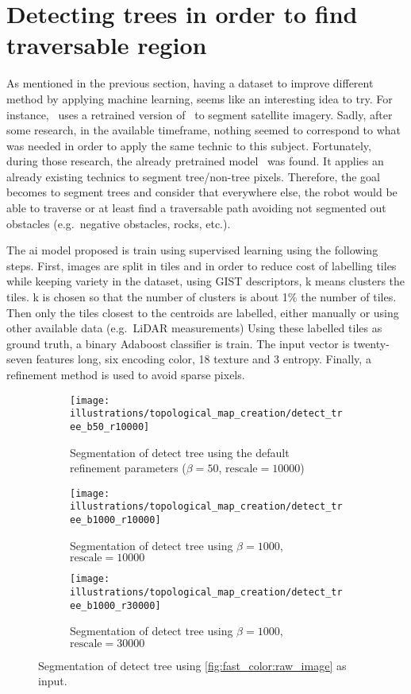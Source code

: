 \section{Detecting trees in order to find traversable region}

As mentioned in the previous section, having a dataset to improve different method by applying machine learning, seems
like an interesting idea to try.
For instance,~\cite{zhang_dual-bev_2025} uses a retrained version of~\cite{ronneberger_u-net_2015} to segment satellite imagery.
Sadly, after some research, in the available timeframe, nothing seemed to correspond to what was needed in order to
apply the same technic to this subject.
Fortunately, during those research, the already pretrained model~\cite{bosch_journal_2020} was found.
It applies an already existing technics to segment tree/non-tree pixels.
Therefore, the goal becomes to segment trees and consider that everywhere else, the robot would be able to traverse
or at least find a traversable path avoiding not segmented out obstacles (e.g.\ negative obstacles, rocks, etc.).

The \gls{ai} model proposed is train using supervised learning using the following steps.
First, images are split in tiles and in order to reduce cost of labelling tiles while keeping variety in the dataset,
using GIST descriptors, k means clusters the tiles.
k is chosen so that the number of clusters is about 1\% the number of tiles.
Then only the tiles closest to the centroids are labelled, either manually or using other available data (e.g.\ LiDAR measurements)
Using these labelled tiles as ground truth, a binary Adaboost classifier is train.
The input vector is twenty-seven features long, six encoding color, 18 texture and 3 entropy.
Finally, a refinement method is used to avoid sparse pixels.

\begin{figure}
    \begin{subfigure}[t]{.32\textwidth}
        \texttt{[image: illustrations/topological\_map\_creation/detect\_tree\_b50\_r10000]}
        \caption{Segmentation of detect tree using the default refinement parameters ($\beta = 50$, $\text{rescale} = 10000$)}
    \end{subfigure}
    \hfill
    \begin{subfigure}[t]{.32\textwidth}
        \texttt{[image: illustrations/topological\_map\_creation/detect\_tree\_b1000\_r10000]}
        \caption{Segmentation of detect tree using $\beta = 1000$, $\text{rescale} = 10000$}
    \end{subfigure}
    \hfill
    \begin{subfigure}[t]{.32\textwidth}
        \texttt{[image: illustrations/topological\_map\_creation/detect\_tree\_b1000\_r30000]}
        \caption{Segmentation of detect tree using $\beta = 1000$, $\text{rescale} = 30000$}
    \end{subfigure}
    \caption{Segmentation of detect tree using \cref{fig:fast_color:raw_image} as input.}
    \label{fig:detect_tree:results}
\end{figure}


